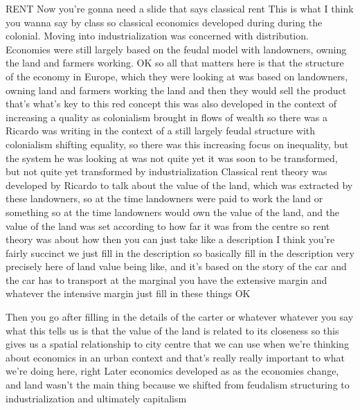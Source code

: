 \documentclass[]{article}
\begin{document}
RENT
Now you’re gonna need a slide that says classical rent
This is what I think you wanna say by class so classical economics developed during during the colonial. Moving into industrialization was concerned with distribution. Economies were still largely based on the feudal model with landowners, owning the land and farmers working.
OK so all that matters here is that the structure of the economy in Europe, which they were looking at was based on landowners, owning land and farmers working the land and then they would sell the product that’s what’s key to this red concept this was also developed in the context of increasing a quality as colonialism brought in flows of wealth so there was a Ricardo was writing in the context of a still largely feudal structure with colonialism shifting equality, so there was this increasing focus on inequality, but the system he was looking at was not quite yet it was soon to be transformed, but not quite yet transformed by industrialization
Classical rent theory was developed by Ricardo to talk about the value of the land, which was extracted by these landowners, so at the time landowners were paid to work the land or something so at the time landowners would own the value of the land, and the value of the land was set according to how far it was from the centre so rent theory was about how then you can just take like a description I think you’re fairly succinct we just fill in the description so basically fill in the description very precisely here of land value being like, and it’s based on the story of the car and the car has to transport at the marginal you have the extensive margin and whatever the intensive margin just fill in these things OK


Then you go after filling in the details of the carter or whatever whatever you say what this tells us is that the value of the land is related to its closeness so this gives us a spatial relationship to city centre that we can use when we’re thinking about economics in an urban context and that’s really really important to what we’re doing here, right
Later economics developed as as the economies change, and land wasn’t the main thing because we shifted from feudalism structuring to industrialization and ultimately capitalism
\end{document}
